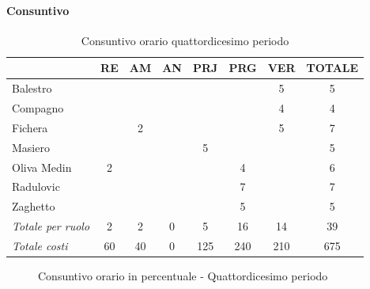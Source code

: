\documentclass[a4paper,12pt]{article}
\begin{document}
            \paragraph{Consuntivo}
                \begin{table}[H]
                \centering
                \caption{Consuntivo orario quattordicesimo periodo}
                \begin{tabular}{|l|c|c|c|c|c|c|c|}
                \hline
                    \rowcolor{lightgray}{\textbf{Membro}} & {\textbf{RE}} & {\textbf{AM}} & {\textbf{AN}} & {\textbf{PRJ}} & {\textbf{PRG}} & {\textbf{VER}} & {\textbf{TOTALE}}\\
                \hline
                    Balestro & & & & & & 5 & 5\\
                \hline
                    Compagno & & & & & & 4 & 4\\
                \hline
                    Fichera & & 2 & & & & 5 & 7\\
                \hline
                    Masiero & & & & 5 & & & 5\\
                \hline
                    Oliva Medin & 2 & & & & 4 & & 6\\
                \hline
                    Radulovic & & & & & 7 & & 7\\
                \hline
                    Zaghetto & & & & & 5 & & 5\\
                \hline
                    \rowcolor{lightgray}\textit{Totale per ruolo} & 2 & 2 & 0 & 5 & 16 & 14 & 39\\
                \hline
                    \rowcolor{lightgray}\textit{Totale costi} & 60 & 40 & 0 & 125 & 240 & 210 & 675\\
                \hline
                \end{tabular}
                \end{table}

                \begin{figure}[H]
                \centering
                \caption{Consuntivo orario in percentuale - Quattordicesimo periodo}
                \end{figure}
                
\end{document}
